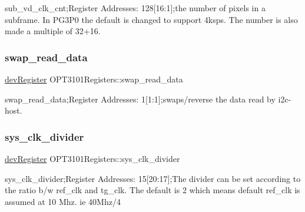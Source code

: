sub\+\_\+vd\+\_\+clk\+\_\+cnt;Register Addresses\+: 128\mbox{[}16\+:1\mbox{]};the number of pixels in a subframe. In P\+G3\+P0 the default is changed to support 4ksps. The number is also made a multiple of 32+16. 

\mbox{\label{class_o_p_t3101_registers_af407d20259e48b205156afa37dc9ec89}} 
\subsubsection{\texorpdfstring{swap\+\_\+read\+\_\+data}{swap\_read\_data}}
{\footnotesize\ttfamily \mbox{\hyperlink{classdev_register}{dev\+Register}} O\+P\+T3101\+Registers\+::swap\+\_\+read\+\_\+data}



swap\+\_\+read\+\_\+data;Register Addresses\+: 1\mbox{[}1\+:1\mbox{]};swaps/reverse the data read by i2c-\/host. 

\mbox{\label{class_o_p_t3101_registers_ae70492bca941ebe87c775a0d0d9bd93a}} 
\subsubsection{\texorpdfstring{sys\+\_\+clk\+\_\+divider}{sys\_clk\_divider}}
{\footnotesize\ttfamily \mbox{\hyperlink{classdev_register}{dev\+Register}} O\+P\+T3101\+Registers\+::sys\+\_\+clk\+\_\+divider}



sys\+\_\+clk\+\_\+divider;Register Addresses\+: 15\mbox{[}20\+:17\mbox{]};The divider can be set according to the ratio b/w ref\+\_\+clk and tg\+\_\+clk. The default is 2 which means default ref\+\_\+clk is assumed at 10 Mhz. ie 40\+Mhz/4 

\mbox{\label{class_o_p_t3101_registers_aa1c31f802608991cabed55f07ad70837}} 
